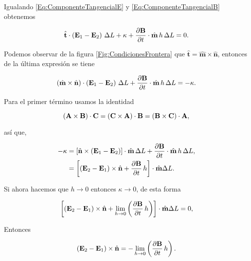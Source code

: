 Igualando \eqref{Eq:ComponenteTangencialE} y \eqref{Eq:ComponenteTangencialB} obtenemos

\begin{equation}
	\hat{\textbf{t}} \cdot \left( \E_{1} - \E_{2} \right) \, \Delta L + \kappa + \diffp{\B}{t} \cdot  \hat{\textbf{m}} \, h\, \Delta L = 0.
\end{equation}

Podemos observar de la figura \ref{Fig:CondicionesFrontera} que $\hat{\textbf{t}} = \hat{\textbf{m}} \times  \hat{\textbf{n}}$, entonces de la última expresión se tiene

\begin{equation}
	\left( \hat{\textbf{m}} \times  \hat{\textbf{n}} \right) \cdot \left( \E_{1} - \E_{2} \right) \, \Delta L + \diffp{\B}{t} \cdot  \hat{\textbf{m}} \, h \, \Delta L = -\kappa.
\end{equation}

Para el primer término usamos la identidad

\begin{equation}
	\left( \textbf{A} \times \textbf{B} \right) \cdot \textbf{C} = \left( \textbf{C} \times \textbf{A} \right) \cdot \textbf{B} = \left( \textbf{B}  \times \textbf{C}  \right) \cdot \textbf{A},
\end{equation}

así que,

\begin{align*}
	-\kappa & = \left[ \hat{\textbf{n} } \times \left( \E_{1} - \E_{2} \right) \right] \cdot  \hat{\textbf{m}} \, \Delta L + \diffp{\B}{t} \cdot  \hat{\textbf{m}} \, h \,\Delta L, \\
	        & = \left[ \left( \E_{2} - \E_{1} \right) \times \hat{\textbf{n}} + \diffp{\B}{t} \, h \right] \cdot  \hat{\textbf{m}} \Delta L.
\end{align*}

Si ahora hacemos que $h\rightarrow 0$ entonces $\kappa\rightarrow 0$, de esta forma

\begin{equation}
	\left[ \left( \E_{2} - \E_{1} \right) \times \hat{\textbf{n}} + \lim_{h\rightarrow 0} \left( \diffp{\B}{t} \, h \right) \right] \cdot  \hat{\textbf{m}} \Delta L = 0,
\end{equation}

Entonces

\begin{equation}
	\label{Eq:CondicionesFronteraTangencial}
	\left( \E_{2} - \E_{1} \right) \times \hat{\textbf{n}} = -\lim_{h\rightarrow 0} \left( \diffp{\B}{t} \, h \right).
\end{equation}

